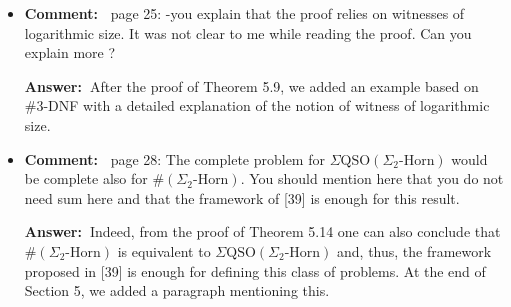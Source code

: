\documentclass[a4paper]{article}
\newcommand{\ans}{{\bf Answer:\ }}
\newcommand{\cm}[1]{{\bf Comment:\ } #1}
\begin{document}
\begin{itemize}
	
	\item \cm{page 25: 	-you explain that the proof relies on witnesses of logarithmic size.	It was not clear to me while reading the proof. Can you explain more ?}
	
	\ans After the proof of Theorem 5.9, we added an example based on \#3-DNF with a detailed explanation of the notion of witness of logarithmic size.
	
	\item \cm{page 28: The complete problem for $\Sigma\text{QSO}(\Sigma_2\text{-Horn})$ would be complete also for $\#(\Sigma_2\text{-Horn})$. You should mention here that you do not need sum here and that the framework of [39] is enough for this result.}
	
	\ans Indeed, from the proof of Theorem 5.14 one can also conclude that $\#(\Sigma_2\text{-Horn})$ is equivalent to $\Sigma\text{QSO}(\Sigma_2\text{-Horn})$ and, thus, the framework proposed in [39] is enough for defining this class of problems. At the end of Section 5, we added a paragraph mentioning this. 
	

\end{itemize}
\end{document}
